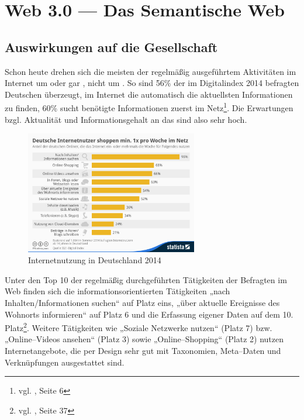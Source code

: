 \section{Web 3.0 --- Das Semantische Web}
\label{sec:hauptteil}

\subsection{Auswirkungen auf die Gesellschaft}

Schon heute drehen sich die meisten der regelmäßig ausgeführtem Aktivitäten im Internet um  oder gar , nicht um . So sind 56\% der im Digitalindex 2014 befragten Deutschen überzeugt, im Internet die automatisch die aktuellsten Informationen zu finden, 60\% sucht benötigte Informationen zuerst im Netz\footnote{vgl. \cite{d21}, Seite 6}. Die Erwartungen bzgl. Aktualität und Informationsgehalt an das  sind also sehr hoch. 

\begin{figure}[H]
\begin{center}
\includegraphics[width=0.67\textwidth]{inetnutzung.jpg}
\caption[Internetnutzung in Deutschland 2014]{Internetnutzung in Deutschland 2014\protect\footnotemark}
\label{pic:inetnutzung}
\end{center}
\end{figure}

Unter den Top 10 der regelmäßig durchgeführten Tätigkeiten der Befragten im Web finden sich die informationsorientierten Tätigkeiten „nach Inhalten/Informationen suchen“ auf Platz eins, „über aktuelle Ereignisse des Wohnorts informieren“ auf Platz 6 und die Erfassung eigener Daten auf dem 10. Platz\footnote{vgl. \cite{d21}, Seite 37}. Weitere Tätigkeiten wie „Soziale Netzwerke nutzen“ (Platz 7) bzw. „Online--Videos ansehen“ (Platz 3) sowie „Online--Shopping“ (Platz 2) nutzen Internetangebote, die per Design sehr gut mit Taxonomien, Meta--Daten und Verknüpfungen ausgestattet sind.


